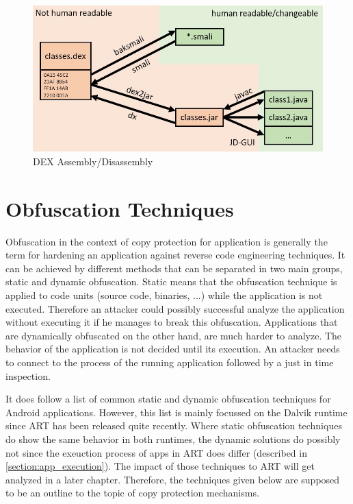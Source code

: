 \begin{figure}[htb]
  \includegraphics[width=\textwidth]{figures/dex_disassembly}
  \caption[DEX Assembly/Disassembly]{DEX Assembly/Disassembly}
  \label{fig:dex_disassembly}
\end{figure}


\section{Obfuscation Techniques}\label{section:obfuscation_techniques}
Obfuscation in the context of copy protection for application
is generally the term for hardening an application against
reverse code engineering techniques. It can be achieved by different methods
that can be separated in two main groups, static and dynamic obfuscation.
Static means that the obfuscation technique is applied to code units (source
code, binaries, ...) while the application is not executed. Therefore an
attacker could possibly successful analyze the application without executing it
if he manages to break this obfuscation. Applications that are dynamically
obfuscated on the other hand, are much harder to analyze. The behavior
of the application is not decided until its execution. An attacker needs to connect to the process of the running application followed by a just in time inspection.

It does follow a list of common static and dynamic obfuscation techniques
for Android applications. However, this list is mainly focussed on
the Dalvik runtime since ART has been released quite recently.
Where static obfuscation techniques do show the same behavior in both
runtimes, the dynamic solutions do possibly not since the exeuction process
of apps in ART does differ (described in \autoref{section:app_execution}).
The impact of those techniques to ART will get analyzed in a later chapter.
Therefore, the techniques given below are supposed to be an outline to
the topic of copy protection mechanisms.


